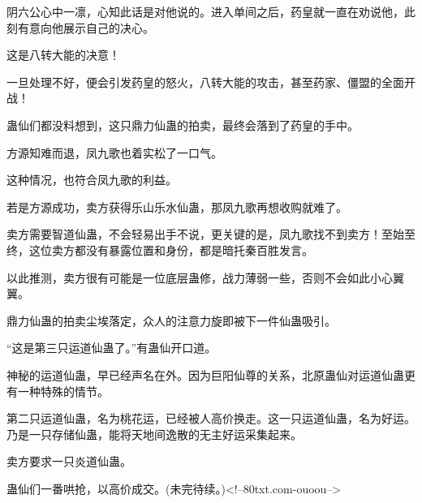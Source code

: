 \begin{this_body}
阴六公心中一凛，心知此话是对他说的。进入单间之后，药皇就一直在劝说他，此刻有意向他展示自己的决心。

这是八转大能的决意！

一旦处理不好，便会引发药皇的怒火，八转大能的攻击，甚至药家、僵盟的全面开战！

蛊仙们都没料想到，这只鼎力仙蛊的拍卖，最终会落到了药皇的手中。

方源知难而退，凤九歌也着实松了一口气。

这种情况，也符合凤九歌的利益。

若是方源成功，卖方获得乐山乐水仙蛊，那凤九歌再想收购就难了。

卖方需要智道仙蛊，不会轻易出手不说，更关键的是，凤九歌找不到卖方！至始至终，这位卖方都没有暴露位置和身份，都是暗托秦百胜发言。

以此推测，卖方很有可能是一位底层蛊修，战力薄弱一些，否则不会如此小心翼翼。

鼎力仙蛊的拍卖尘埃落定，众人的注意力旋即被下一件仙蛊吸引。

“这是第三只运道仙蛊了。”有蛊仙开口道。

神秘的运道仙蛊，早已经声名在外。因为巨阳仙尊的关系，北原蛊仙对运道仙蛊更有一种特殊的情节。

第二只运道仙蛊，名为桃花运，已经被人高价换走。这一只运道仙蛊，名为好运。乃是一只存储仙蛊，能将天地间逸散的无主好运采集起来。

卖方要求一只炎道仙蛊。

蛊仙们一番哄抢，以高价成交。(未完待续。)<!--80txt.com-ouoou-->

\end{this_body}

